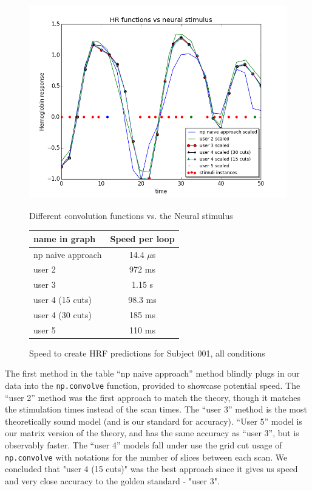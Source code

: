 \begin{figure}[ht]
\centering
	\begin{minipage}[b]{0.45\linewidth}
		\centering
		\includegraphics[width=.8\linewidth]{../images/convolution_vs_neural_stimulus}
		\caption{\scriptsize{Different convolution functions vs. the Neural stimulus}}
		\label{fig:convolution}

	\end{minipage}
\quad
	\begin{minipage}[b]{0.45\linewidth}
		\centering
		\begin{tabular}{|l | c|}
		\hline
		name in graph       & Speed per loop \\
		\hline
		np naive approach & 14.4 $\mu$s  \\
		user 2     		    & 972 ms  \\
		user 3     		    & 1.15 s    \\
		user 4 (15 cuts)      & 98.3 ms \\
		user 4 (30 cuts)      & 185 ms  \\
		user 5     	 	    & 110 ms   \\
		\hline
		\end{tabular}
		\vspace{5mm}
		\caption{\scriptsize{Speed to create HRF predictions for Subject 001, 
		all conditions}}
		\label{table:convolution}
	\end{minipage}
\end{figure}

The first method in the table ``np naive approach'' method blindly plugs 
in our data into the \texttt{np.convolve} function, provided to showcase 
potential speed. The ``user 2'' method  was the first approach to match the 
theory, though it matches the stimulation times instead of the scan times. 
The ``user 3'' method is the most theoretically sound model (and is our 
standard for accuracy). ``User 5'' model  is our matrix version of the theory, 
and has the same accuracy as ``user 3'', but is observably faster. The 
``user 4'' models fall under use the grid cut usage of \texttt{np.convolve}
with notations for the number of slices between each scan. We concluded that 
"user 4 (15 cuts)" was the best approach since it gives us speed and very 
close accuracy to the golden standard - "user 3".






